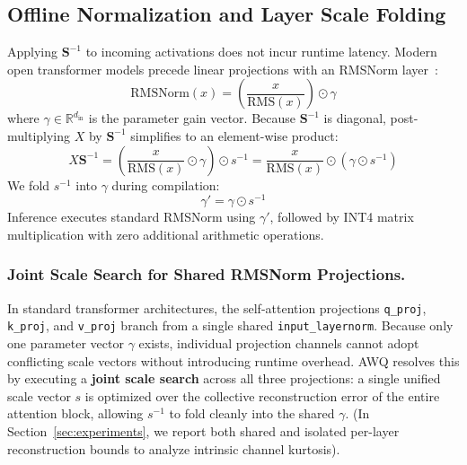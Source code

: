 \documentclass[runningheads,oribibl]{llncs}
\begin{document}
\subsection{Offline Normalization and Layer Scale Folding}
Applying $\mathbf{S}^{-1}$ to incoming activations does not incur runtime latency. Modern open transformer models precede linear projections with an RMSNorm layer~\cite{zhang2019rmsnorm,touvron2023llama}:
\begin{equation}
\text{RMSNorm}(x) = \left( \frac{x}{\text{RMS}(x)} \right) \odot \gamma
\end{equation}
where $\gamma \in \mathbb{R}^{d_{\text{in}}}$ is the parameter gain vector. Because $\mathbf{S}^{-1}$ is diagonal, post-multiplying $X$ by $\mathbf{S}^{-1}$ simplifies to an element-wise product:
\begin{equation}
X \mathbf{S}^{-1} = \left( \frac{x}{\text{RMS}(x)} \odot \gamma \right) \odot s^{-1} = \frac{x}{\text{RMS}(x)} \odot \left( \gamma \odot s^{-1} \right)
\end{equation}
We fold $s^{-1}$ into $\gamma$ during compilation:
\begin{equation}
\gamma' = \gamma \odot s^{-1}
\end{equation}
Inference executes standard RMSNorm using $\gamma'$, followed by INT4 matrix multiplication with zero additional arithmetic operations.

\subsubsection{Joint Scale Search for Shared RMSNorm Projections.}
In standard transformer architectures, the self-attention projections \texttt{q\_proj}, \texttt{k\_proj}, and \texttt{v\_proj} branch from a single shared \texttt{input\_layernorm}. Because only one parameter vector $\gamma$ exists, individual projection channels cannot adopt conflicting scale vectors without introducing runtime overhead. AWQ resolves this by executing a \textbf{joint scale search} across all three projections: a single unified scale vector $s$ is optimized over the collective reconstruction error of the entire attention block, allowing $s^{-1}$ to fold cleanly into the shared $\gamma$. (In Section~\ref{sec:experiments}, we report both shared and isolated per-layer reconstruction bounds to analyze intrinsic channel kurtosis).
\end{document}
